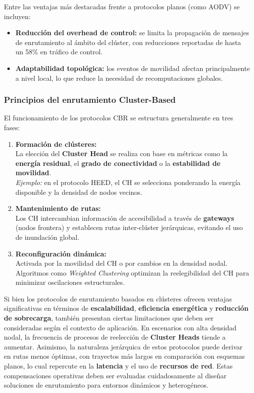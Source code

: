 \documentclass{article}
\begin{document}
Entre las ventajas más destacadas frente a protocolos planos (como AODV) se incluyen:

\begin{itemize}
    \item \textbf{Reducción del overhead de control:} se limita la propagación de mensajes de enrutamiento al ámbito del clúster, con reducciones reportadas de hasta un 58\% en tráfico de control.
    \item \textbf{Adaptabilidad topológica:} los eventos de movilidad afectan principalmente a nivel local, lo que reduce la necesidad de recomputaciones globales.
\end{itemize}


\subsubsection{Principios del enrutamiento Cluster-Based}
El funcionamiento de los protocolos CBR se estructura generalmente en tres fases:
\begin{enumerate}
    \item \textbf{Formación de clústeres:} \\
    La elección del \textbf{Cluster Head} se realiza con base en métricas como la \textbf{energía residual}, el \textbf{grado de conectividad} o la \textbf{estabilidad de movilidad}. \\
    \textit{Ejemplo:} en el protocolo HEED, el CH se selecciona ponderando la energía disponible y la densidad de nodos vecinos.

    \item \textbf{Mantenimiento de rutas:} \\
    Los CH intercambian información de accesibilidad a través de \textbf{gateways} (nodos frontera) y establecen rutas inter-clúster jerárquicas, evitando el uso de inundación global.

    \item \textbf{Reconfiguración dinámica:} \\
    Activada por la movilidad del CH o por cambios en la densidad nodal. Algoritmos como \textit{Weighted Clustering} optimizan la reelegibilidad del CH para minimizar oscilaciones estructurales.
\end{enumerate}

Si bien los protocolos de enrutamiento basados en clústeres ofrecen ventajas significativas en términos de \textbf{escalabilidad}, \textbf{eficiencia energética} y \textbf{reducción de sobrecarga}, también presentan ciertas limitaciones que deben ser consideradas según el contexto de aplicación. En escenarios con alta densidad nodal, la frecuencia de procesos de reelección de \textbf{Cluster Heads} tiende a aumentar. Asimismo, la naturaleza jerárquica de estos protocolos puede derivar en rutas menos óptimas, con trayectos más largos en comparación con esquemas planos, lo cual repercute en la \textbf{latencia} y el uso de \textbf{recursos de red}. Estas compensaciones operativas deben ser evaluadas cuidadosamente al diseñar soluciones de enrutamiento para entornos dinámicos y heterogéneos.
\end{document}
